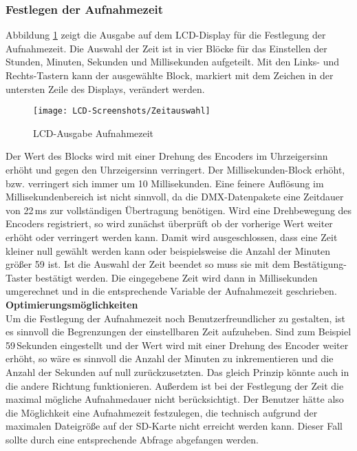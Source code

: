 \subsubsection{Festlegen der Aufnahmezeit}
Abbildung \ref{lcd:rectime} zeigt die Ausgabe auf dem LCD-Display für die Festlegung der Aufnahmezeit. Die Auswahl der Zeit ist in vier Blöcke für das Einstellen der Stunden, Minuten, Sekunden und Millisekunden aufgeteilt. Mit den Links- und Rechts-Tastern kann der ausgewählte Block, markiert mit dem Zeichen in der untersten Zeile des Displays, verändert werden. 
\begin{figure}[h]
	\begin{center}
		\texttt{[image: LCD-Screenshots/Zeitauswahl]}
		\caption{LCD-Ausgabe Aufnahmezeit}
		\label{lcd:rectime}
	\end{center}
\end{figure}
Der Wert des Blocks wird mit einer Drehung des Encoders im Uhrzeigersinn erhöht und gegen den Uhrzeigersinn verringert. Der Millisekunden-Block erhöht, bzw. verringert sich immer um 10 Millisekunden. Eine feinere Auflösung im Millisekundenbereich ist nicht sinnvoll, da die DMX-Datenpakete eine Zeitdauer von 22\,ms zur vollständigen Übertragung benötigen. Wird eine Drehbewegung des Encoders registriert, so wird zunächst überprüft ob der vorherige Wert weiter erhöht oder verringert werden kann. Damit wird ausgeschlossen, dass eine Zeit kleiner null gewählt werden kann oder beispielsweise die Anzahl der Minuten größer 59 ist. Ist die Auswahl der Zeit beendet so muss sie mit dem Bestätigung-Taster bestätigt werden. Die eingegebene Zeit wird dann in Millisekunden umgerechnet und in die entsprechende Variable der Aufnahmezeit geschrieben.\\
\newline
\textbf{Optimierungsmöglichkeiten}\\
Um die Festlegung der Aufnahmezeit noch Benutzerfreundlicher zu gestalten, ist es sinnvoll die Begrenzungen der einstellbaren Zeit aufzuheben. Sind zum Beispiel 59\,Sekunden eingestellt und der Wert wird mit einer Drehung des Encoder weiter erhöht, so wäre es sinnvoll die Anzahl der Minuten zu inkrementieren und die Anzahl der Sekunden auf null zurückzusetzten. Das gleich Prinzip könnte auch in die andere Richtung funktionieren. Außerdem ist bei der Festlegung der Zeit die maximal mögliche Aufnahmedauer nicht berücksichtigt. Der Benutzer hätte also die Möglichkeit eine Aufnahmezeit festzulegen, die technisch aufgrund der maximalen Dateigröße auf der SD-Karte nicht erreicht werden kann. Dieser Fall sollte durch eine entsprechende Abfrage abgefangen werden.
